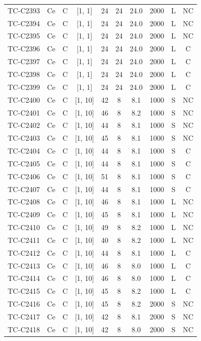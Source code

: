 \begin{longtable}{lccccccccc}
TC-C2393 & Ce & C & [1, 1] & 24 & 24 & 24.0 & 2000 & L & NC \\
TC-C2394 & Ce & C & [1, 1] & 24 & 24 & 24.0 & 2000 & L & NC \\
TC-C2395 & Ce & C & [1, 1] & 24 & 24 & 24.0 & 2000 & L & NC \\
TC-C2396 & Ce & C & [1, 1] & 24 & 24 & 24.0 & 2000 & L & C \\
TC-C2397 & Ce & C & [1, 1] & 24 & 24 & 24.0 & 2000 & L & C \\
TC-C2398 & Ce & C & [1, 1] & 24 & 24 & 24.0 & 2000 & L & C \\
TC-C2399 & Ce & C & [1, 1] & 24 & 24 & 24.0 & 2000 & L & C \\
TC-C2400 & Ce & C & [1, 10] & 42 & 8 & 8.1 & 1000 & S & NC \\
TC-C2401 & Ce & C & [1, 10] & 46 & 8 & 8.2 & 1000 & S & NC \\
TC-C2402 & Ce & C & [1, 10] & 44 & 8 & 8.1 & 1000 & S & NC \\
TC-C2403 & Ce & C & [1, 10] & 45 & 8 & 8.1 & 1000 & S & NC \\
TC-C2404 & Ce & C & [1, 10] & 44 & 8 & 8.1 & 1000 & S & C \\
TC-C2405 & Ce & C & [1, 10] & 44 & 8 & 8.1 & 1000 & S & C \\
TC-C2406 & Ce & C & [1, 10] & 51 & 8 & 8.1 & 1000 & S & C \\
TC-C2407 & Ce & C & [1, 10] & 44 & 8 & 8.1 & 1000 & S & C \\
TC-C2408 & Ce & C & [1, 10] & 46 & 8 & 8.1 & 1000 & L & NC \\
TC-C2409 & Ce & C & [1, 10] & 45 & 8 & 8.1 & 1000 & L & NC \\
TC-C2410 & Ce & C & [1, 10] & 49 & 8 & 8.2 & 1000 & L & NC \\
TC-C2411 & Ce & C & [1, 10] & 40 & 8 & 8.2 & 1000 & L & NC \\
TC-C2412 & Ce & C & [1, 10] & 44 & 8 & 8.1 & 1000 & L & C \\
TC-C2413 & Ce & C & [1, 10] & 46 & 8 & 8.0 & 1000 & L & C \\
TC-C2414 & Ce & C & [1, 10] & 46 & 8 & 8.0 & 1000 & L & C \\
TC-C2415 & Ce & C & [1, 10] & 45 & 8 & 8.2 & 1000 & L & C \\
TC-C2416 & Ce & C & [1, 10] & 45 & 8 & 8.2 & 2000 & S & NC \\
TC-C2417 & Ce & C & [1, 10] & 42 & 8 & 8.1 & 2000 & S & NC \\
TC-C2418 & Ce & C & [1, 10] & 42 & 8 & 8.0 & 2000 & S & NC \\

\end{longtable}
